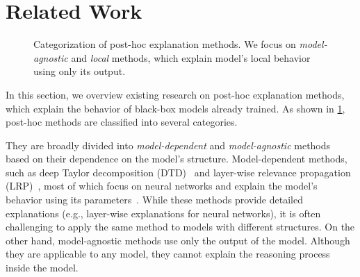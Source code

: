 \documentclass[runningheads]{llncs}
\begin{document}
\section{Related Work}
\begin{figure}[tbp]
  \centering
  \def\w{2.5}
  \def\ww{5.0}
  \def\h{0.5}
  \def\hh{1.3}
  \def\hhh{1.8}
  \def\hhhh{2.6}
  \caption{%
    Categorization of post-hoc explanation methods.
    We focus on \emph{model-agnostic} and \emph{local} methods,
    which explain model's local behavior using only its output.
  }\label{fig:post-hoc}
\end{figure}
In this section,
we overview existing research on post-hoc explanation methods,
which explain the behavior of black-box models already trained.
As shown in \cref{fig:post-hoc},
post-hoc methods are classified into several categories.

They are broadly divided into
\emph{model-dependent} and \emph{model-agnostic} methods
based on their dependence on the model's structure.
Model-dependent methods,
such as deep Taylor decomposition (DTD)~\cite{montavon2017explaining}
and layer-wise relevance propagation (LRP)~\cite{bach2015pixel},
most of which focus on neural networks and
explain the model's behavior using its parameters~\cite{samek2021explaining}.
While these methods provide detailed explanations
(e.g., layer-wise explanations for neural networks),
it is often challenging
to apply the same method to models with different structures.
On the other hand,
model-agnostic methods use only the output of the model.
Although they are applicable to any model,
they cannot explain the reasoning process inside the model.
\end{document}
